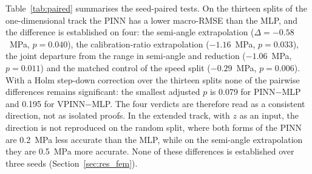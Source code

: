 
Table~\ref{tab:paired} summarises the seed-paired tests. On the thirteen splits of the one-dimensional track the PINN has a lower macro-RMSE than the MLP, and the difference is established on four: the semi-angle extrapolation ($\Delta=-0.58$~MPa, $p=0.040$), the calibration-ratio extrapolation ($-1.16$~MPa, $p=0.033$), the joint departure from the range in semi-angle and reduction ($-1.06$~MPa, $p=0.011$) and the matched control of the speed split ($-0.29$~MPa, $p=0.006$). With a Holm step-down correction \citep{holm1979,demsar2006} over the thirteen splits none of the pairwise differences remains significant: the smallest adjusted $p$ is 0.079 for PINN$-$MLP and 0.195 for VPINN$-$MLP. The four verdicts are therefore read as a consistent direction, not as isolated proofs. In the extended track, with $z$ as an input, the direction is not reproduced on the random split, where both forms of the PINN are 0.2~MPa less accurate than the MLP, while on the semi-angle extrapolation they are 0.5~MPa more accurate. None of these differences is established over three seeds (Section~\ref{sec:res_fem}). %
